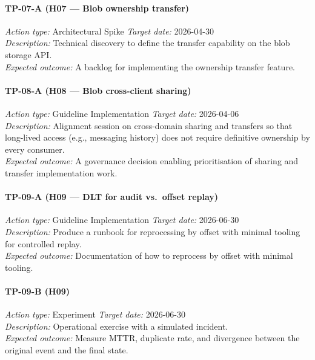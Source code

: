 \paragraph{TP-07-A \textnormal{(H07 — Blob ownership transfer)}}
\textit{Action type:} Architectural Spike \quad \textit{Target date:} 2026-04-30 \\
\textit{Description:} Technical discovery to define the transfer capability on
the blob storage API. \\
\textit{Expected outcome:} A backlog for implementing the ownership transfer
feature.

\paragraph{TP-08-A \textnormal{(H08 — Blob cross-client sharing)}}
\textit{Action type:} Guideline Implementation \quad \textit{Target date:} 2026-04-06 \\
\textit{Description:} Alignment session on cross-domain sharing and transfers
so that long-lived access (e.g., messaging history) does not require definitive
ownership by every consumer. \\
\textit{Expected outcome:} A governance decision enabling prioritisation of
sharing and transfer implementation work.

\paragraph{TP-09-A \textnormal{(H09 — DLT for audit vs.\ offset replay)}}
\textit{Action type:} Guideline Implementation \quad \textit{Target date:} 2026-06-30 \\
\textit{Description:} Produce a runbook for reprocessing by offset with minimal
tooling for controlled replay. \\
\textit{Expected outcome:} Documentation of how to reprocess by offset with
minimal tooling.

\paragraph{TP-09-B \textnormal{(H09)}}
\textit{Action type:} Experiment \quad \textit{Target date:} 2026-06-30 \\
\textit{Description:} Operational exercise with a simulated incident. \\
\textit{Expected outcome:} Measure MTTR, duplicate rate, and divergence between
the original event and the final state.

